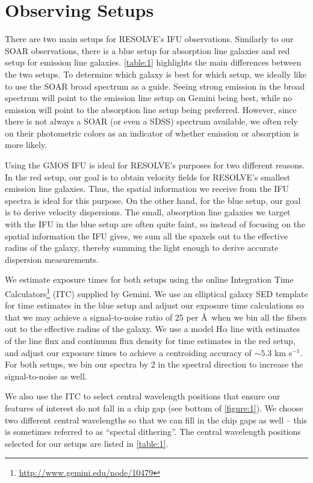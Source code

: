 \documentclass[12pt]{report}
\begin{document}
\section{Observing Setups}
There are two main setups for RESOLVE's IFU observations. Similarly to our SOAR observations, there is a blue setup for absorption line galaxies and red setup for emission line galaxies. \autoref{table:1} highlights the main differences between the two setups. To determine which galaxy is best for which setup, we ideally like to use the SOAR broad spectrum as a guide. Seeing strong emission in the broad spectrum will point to the emission line setup on Gemini being best, while no emission will point to the absorption line setup being preferred. However, since there is not always a SOAR (or even a SDSS) spectrum available, we often rely on their photometric colors as an indicator of whether emission or absorption is more likely.

Using the GMOS IFU is ideal for RESOLVE's purposes for two different reasons. In the red setup, our goal is to obtain velocity fields for RESOLVE's smallest emission line galaxies. Thus, the spatial information we receive from the IFU spectra is ideal for this purpose. On the other hand, for the blue setup, our goal is to derive velocity dispersions. The small, absorption line galaxies we target with the IFU in the blue setup are often quite faint, so instead of focusing on the spatial information the IFU gives, we sum all the spaxels out to the effective radius of the galaxy, thereby summing the light enough to derive accurate dispersion measurements. 

We estimate exposure times for both setups using the online Integration Time Calculators\footnote{\url{http://www.gemini.edu/node/10479}} (ITC) supplied by Gemini. We use an elliptical galaxy SED template for time estimates in the blue setup and adjust our exposure time calculations so that we may achieve a signal-to-noise ratio of 25 per \AA\ when we bin all the fibers out to the effective radius of the galaxy. We use a model H$\alpha$ line with estimates of the line flux and continuum flux density for time estimates in the red setup, and adjust our exposure times to achieve a centroiding accuracy of $\sim5.3$ km s$^{-1}$. For both setups, we bin our spectra by 2 in the spectral direction to increase the signal-to-noise as well.

We also use the ITC to select central wavelength positions that ensure our features of interest do not fall in a chip gap (see bottom of \autoref{figure:1}). We choose two different central wavelengths so that we can fill in the chip gaps as well -- this is sometimes referred to as ``spectal dithering''. The central wavelength positions selected for our setups are listed in \autoref{table:1}.
\end{document}
